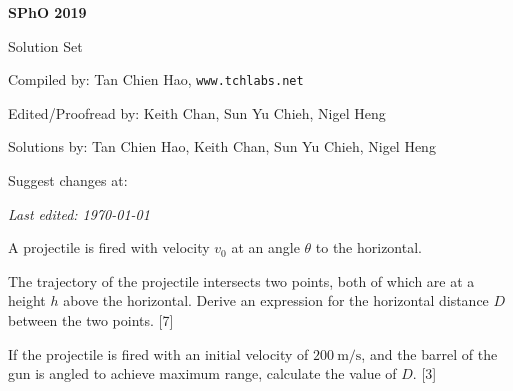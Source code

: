 \def\sphoyear{2019}
\setcounter{section}{0}
\setcounter{solcounter}{0}

\fancyhead[L]{\textbf{SPhO \sphoyear}} 


\begin{titlepage}
\centering

{\Huge\bfseries SPhO \sphoyear}

\vspace{1cm}

{\LARGE Solution Set}

\vspace{2cm}

{\Large Compiled by: Tan Chien Hao, \texttt{www.tchlabs.net}}

\vspace{2cm}

{\Large Edited/Proofread by: Keith Chan, Sun Yu Chieh, Nigel Heng}

\vspace{2cm}

{\Large Solutions by: Tan Chien Hao, Keith Chan, Sun Yu Chieh, Nigel Heng}

\vspace{2cm}

{\large Suggest changes at: \github}


\vfill

{\itshape Last edited: \today}
\end{titlepage}

\begin{problem}
    A projectile is fired with velocity $v_{0}$ at an angle $\theta$ to the horizontal.
    \begin{subproblem}
    The trajectory of the projectile intersects two points, both of which are at a height $h$ above the horizontal. Derive an expression for the horizontal distance $D$ between the two points.
    \hfill{[7]}\end{subproblem}
    \begin{subproblem}
    If the projectile is fired with an initial velocity of $\qty{200}{\m\per\s}$, and the barrel of the gun is angled to achieve maximum range, calculate the value of $D$.
    \hfill{[3]}\end{subproblem}
\end{problem}


